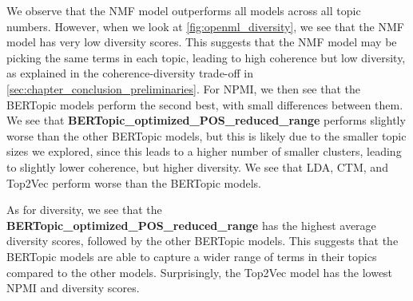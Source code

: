 
We observe that the NMF model outperforms all models across all topic numbers. However, when we look at \cref{fig:openml_diversity}, we see that the NMF model has very low diversity scores. This suggests that the NMF model may be picking the same terms in each topic, leading to high coherence but low diversity, as explained in the coherence-diversity trade-off in \cref{sec:chapter_conclusion_preliminaries}. For NPMI, we then see that the BERTopic models perform the second best, with small differences between them. We see that \textbf{BERTopic\_optimized\_POS\_reduced\_range} performs slightly worse than the other BERTopic models, but this is likely due to the smaller topic sizes we explored, since this leads to a higher number of smaller clusters, leading to slightly lower coherence, but higher diversity. We see that LDA, CTM, and Top2Vec perform worse than the BERTopic models.

As for diversity, we see that the \textbf{BERTopic\_optimized\_POS\_reduced\_range} has the highest average diversity scores, followed by the other BERTopic models. This suggests that the BERTopic models are able to capture a wider range of terms in their topics compared to the other models. Surprisingly, the Top2Vec model has the lowest NPMI and diversity scores.


